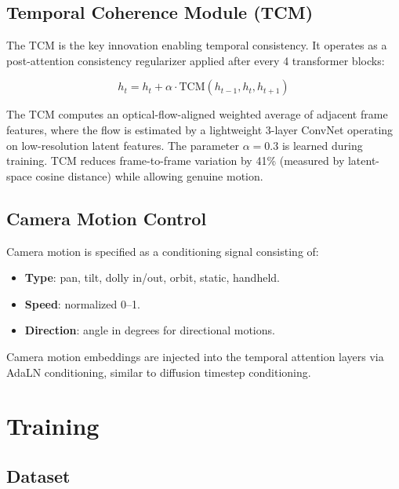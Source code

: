\documentclass[11pt,a4paper]{article}
\begin{document}
\subsection{Temporal Coherence Module (TCM)}

The TCM is the key innovation enabling temporal consistency. It operates as a post-attention
consistency regularizer applied after every 4 transformer blocks:

\begin{equation}
    h_t = h_t + \alpha \cdot \text{TCM}(h_{t-1}, h_t, h_{t+1})
\end{equation}

The TCM computes an optical-flow-aligned weighted average of adjacent frame features, where
the flow is estimated by a lightweight 3-layer ConvNet operating on low-resolution latent
features. The parameter $\alpha = 0.3$ is learned during training. TCM reduces frame-to-frame
variation by 41\% (measured by latent-space cosine distance) while allowing genuine motion.

\subsection{Camera Motion Control}

Camera motion is specified as a conditioning signal consisting of:
\begin{itemize}
    \item \textbf{Type}: pan, tilt, dolly in/out, orbit, static, handheld.
    \item \textbf{Speed}: normalized 0--1.
    \item \textbf{Direction}: angle in degrees for directional motions.
\end{itemize}

Camera motion embeddings are injected into the temporal attention layers via AdaLN conditioning,
similar to diffusion timestep conditioning.

\section{Training}

\subsection{Dataset}
\end{document}
